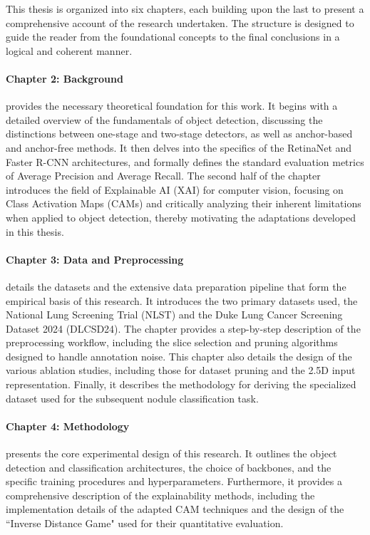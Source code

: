 This thesis is organized into six chapters, each building upon the last to present a comprehensive account of the research undertaken. The structure is designed to guide the reader from the foundational concepts to the final conclusions in a logical and coherent manner.

\paragraph{Chapter 2: Background} provides the necessary theoretical foundation for this work. It begins with a detailed overview of the fundamentals of object detection, discussing the distinctions between one-stage and two-stage detectors, as well as anchor-based and anchor-free methods. It then delves into the specifics of the RetinaNet and Faster R-CNN architectures, and formally defines the standard evaluation metrics of Average Precision and Average Recall. The second half of the chapter introduces the field of Explainable AI (XAI) for computer vision, focusing on Class Activation Maps (CAMs) and critically analyzing their inherent limitations when applied to object detection, thereby motivating the adaptations developed in this thesis.

\paragraph{Chapter 3: Data and Preprocessing} details the datasets and the extensive data preparation pipeline that form the empirical basis of this research. It introduces the two primary datasets used, the National Lung Screening Trial (NLST) and the Duke Lung Cancer Screening Dataset 2024 (DLCSD24). The chapter provides a step-by-step description of the preprocessing workflow, including the slice selection and pruning algorithms designed to handle annotation noise. This chapter also details the design of the various ablation studies, including those for dataset pruning and the 2.5D input representation. Finally, it describes the methodology for deriving the specialized dataset used for the subsequent nodule classification task.


\paragraph{Chapter 4: Methodology} presents the core experimental design of this research. It outlines the object detection and classification architectures, the choice of backbones, and the specific training procedures and hyperparameters. Furthermore, it provides a comprehensive description of the explainability methods, including the implementation details of the adapted CAM techniques and the design of the ``Inverse Distance Game" used for their quantitative evaluation.

